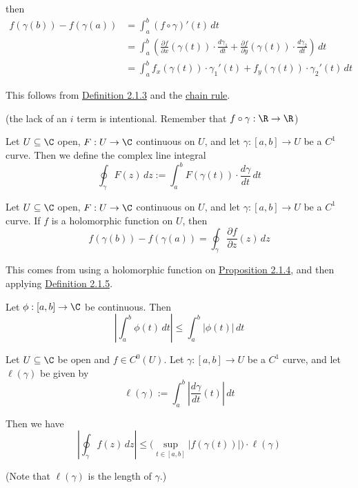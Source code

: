 then
\begin{align*}
  f(\gamma(b))-f(\gamma(a))
   & =\int_a^b (f\circ\gamma)'(t)\,dt \\
   & =\int_a^b\left(
  \frac{\partial f}{\partial x}(\gamma(t))\cdot\frac{d\gamma_1}{dt}+
  \frac{\partial f}{\partial y}(\gamma(t))\cdot\frac{d\gamma_2}{dt}
  \right)\,dt                         \\
   & =\int_a^b
  f_x(\gamma(t))\cdot\gamma_1'(t)+f_y(\gamma(t))\cdot\gamma_2'(t)
  \,dt
\end{align*}

This follows from \href{c511702}{Definition 2.1.3} and the \href{d969d46}{chain
rule}.

(the lack of an $i$ term is intentional. Remember that
$f\circ\gamma:\R\to\R$)

\label{b1e96fc}

Let $U\subseteq\C$ open, $F:U\to\C$ continuous on $U$, and let $\gamma:[a,b]\to
U$ be a $C^1$ curve. Then we define the complex line integral
$$
  \oint_\gamma F(z)\,dz:=\int_a^bF(\gamma(t))\cdot\frac{d\gamma}{dt}\,dt
$$

\label{c526c09}

Let $U\subseteq\C$ open, $F:U\to\C$ continuous on $U$, and let $\gamma:[a,b]\to
U$ be a $C^1$ curve. If $f$ is a holomorphic function on $U$, then
$$
  f(\gamma(b))-f(\gamma(a))=\oint_\gamma\frac{\partial f}{\partial z}(z)\,dz
$$

This comes from using a holomorphic function on \href{f37b676}{Proposition
2.1.4}, and then applying \href{b1e96fc}{Definition 2.1.5}.

\label{bcec8b1}

Let $\phi:[a,b]\to\C$ be continuous. Then
$$
  \left|\int_a^b\phi(t)\,dt\right|\leq\int_a^b|\phi(t)|\,dt
$$

\label{faf3f86}

Let $U\subseteq\C$ be open and $f\in C^0(U)$. Let $\gamma:[a,b]\to U$ be a
$C^1$ curve, and let $\ell(\gamma)$ be given by
$$
  \ell(\gamma):=\int_a^b\left|\frac{d\gamma}{dt}(t)\right|\,dt
$$

Then we have
$$
  \left|\oint_\gamma f(z)\,dz\right|\leq
  \Big(\sup_{t\in[a,b]}|f(\gamma(t))|\Big)\cdot\ell(\gamma)
$$

(Note that $\ell(\gamma)$ is the length of $\gamma$.)

\label{f74efcb}

